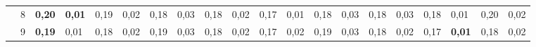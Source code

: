 \documentclass[conference]{IEEEtran}
\begin{document}
\begin{table}[]
\begin{tabular}{|cl|ll|ll|ll|ll|ll|ll|ll|ll|ll|}
		\multicolumn{1}{|c|}{}                    & 8 & \multicolumn{1}{l|}{\textbf{0,20}} & \textbf{0,01} & \multicolumn{1}{l|}{0,19}          & 0,02          & \multicolumn{1}{l|}{0,18}          & 0,03          & \multicolumn{1}{l|}{0,18} & 0,02          & \multicolumn{1}{l|}{0,17}                 & 0,01          & \multicolumn{1}{l|}{0,18}          & 0,03          & \multicolumn{1}{l|}{0,18}          & 0,03          & \multicolumn{1}{l|}{0,18}          & 0,01          & \multicolumn{1}{l|}{0,20}          & 0,02          \\ \cline{2-20} 
		\multicolumn{1}{|c|}{}                    & 9 & \multicolumn{1}{l|}{\textbf{0,19}} & 0,01          & \multicolumn{1}{l|}{0,18}          & 0,02          & \multicolumn{1}{l|}{0,19}          & 0,03          & \multicolumn{1}{l|}{0,18} & 0,02          & \multicolumn{1}{l|}{0,17}                 & 0,02          & \multicolumn{1}{l|}{0,19}          & 0,03          & \multicolumn{1}{l|}{0,18}          & 0,02          & \multicolumn{1}{l|}{0,17}          & \textbf{0,01} & \multicolumn{1}{l|}{0,18}          & 0,02          \\ \hline
	\end{tabular}
\end{table}
\end{document}
